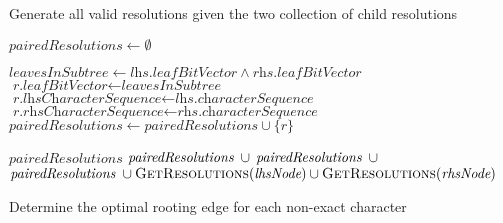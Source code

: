 \documentclass[12pt]{article}
\begin{document}
{\begin{algorithm}
	\caption{Generate all valid resolutions given the two collection of child resolutions}
	\label{Alg:generate-resolutions}
	\begin{algorithmic}[1]
		\State $\textit{pairedResolutions} \gets \emptyset$

		    \State $\textit{leavesInSubtree} \gets \textit{lhs.leafBitVector} \land \textit{rhs.leafBitVector}$
		      \State $\textit{r.leafBitVector} \gets \textit{leavesInSubtree}$
		      \State $\textit{r.lhsCharacterSequence} \gets \textit{lhs.characterSequence}$
		      \State $\textit{r.rhsCharacterSequence} \gets \textit{rhs.characterSequence}$
		      \State $\textit{pairedResolutions} \gets \textit{pairedResolutions} \cup \{r\}$
		    \EndIf    
		  \EndFor
		\EndFor
		
		 \State \Return $\textit{pairedResolutions}$
		\EndCase
		  \State \Return $\textit{pairedResolutions} \hspace{0.5em} \cup$ 
		\EndCase
		  \State \Return $\textit{pairedResolutions} \hspace{0.5em} \cup$ 
		\EndCase
		  \State \Return $\textit{pairedResolutions} \hspace{0.3em} \cup \Call{GetResolutions}{\textit{lhsNode}} \cup \Call{GetResolutions}{\textit{rhsNode}}$
		\EndCase
		\EndSwitch
		\EndFunction
	\end{algorithmic}
\end{algorithm}
\clearpage

\begin{algorithm}
	\caption{Determine the optimal rooting edge for each non-exact character}
	\label{Alg:generate-resolutions}
	\begin{algorithmic}[1]
		

\end{algorithmic}
\end{algorithm}}
\end{document}

